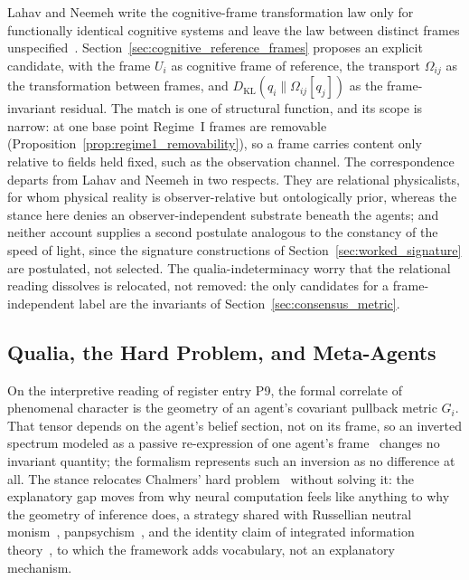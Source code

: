 \documentclass[11pt]{article}
\begin{document}
Lahav and Neemeh write the cognitive-frame transformation law only for functionally identical cognitive systems and leave the law between distinct frames unspecified~\cite{LahavNeemeh2022, LahavNeemeh2025}. Section~\ref{sec:cognitive_reference_frames} proposes an explicit candidate, with the frame $U_i$ as cognitive frame of reference, the transport $\Omega_{ij}$ as the transformation between frames, and $D_{\mathrm{KL}}(q_i \| \Omega_{ij}[q_j])$ as the frame-invariant residual. The match is one of structural function, and its scope is narrow: at one base point Regime~I frames are removable (Proposition~\ref{prop:regime1_removability}), so a frame carries content only relative to fields held fixed, such as the observation channel. The correspondence departs from Lahav and Neemeh in two respects. They are relational physicalists, for whom physical reality is observer-relative but ontologically prior, whereas the stance here denies an observer-independent substrate beneath the agents; and neither account supplies a second postulate analogous to the constancy of the speed of light, since the signature constructions of Section~\ref{sec:worked_signature} are postulated, not selected. The qualia-indeterminacy worry that the relational reading dissolves is relocated, not removed: the only candidates for a frame-independent label are the invariants of Section~\ref{sec:consensus_metric}.

\subsection{Qualia, the Hard Problem, and Meta-Agents}

On the interpretive reading of register entry P9, the formal correlate of phenomenal character is the geometry of an agent's covariant pullback metric $G_i$. That tensor depends on the agent's belief section, not on its frame, so an inverted spectrum modeled as a passive re-expression of one agent's frame~\cite{Shoemaker1982} changes no invariant quantity; the formalism represents such an inversion as no difference at all. The stance relocates Chalmers' hard problem~\cite{Chalmers1995, Chalmers1996} without solving it: the explanatory gap moves from why neural computation feels like anything to why the geometry of inference does, a strategy shared with Russellian neutral monism~\cite{Russell1927, Strawson2006}, panpsychism~\cite{Goff2017, Chalmers2013consciousness}, and the identity claim of integrated information theory~\cite{Tononi2008, Tononi2015}, to which the framework adds vocabulary, not an explanatory mechanism.
\end{document}
